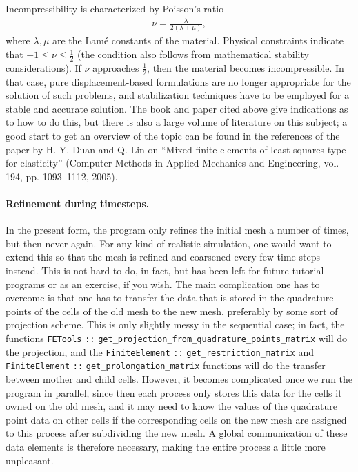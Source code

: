 \documentclass{article}
\begin{document}
Incompressibility is characterized by Poisson's ratio
\begin{gather*}
  \nu = \frac{\lambda}{2(\lambda+\mu)},
\end{gather*}
where $\lambda,\mu$ are the Lam\'e constants of the material.
Physical constraints indicate that $-1\le \nu\le \tfrac 12$ (the condition
also follows from mathematical stability considerations). If $\nu$
approaches $\tfrac 12$, then the material becomes incompressible. In that
case, pure displacement-based formulations are no longer appropriate for the
solution of such problems, and stabilization techniques have to be employed
for a stable and accurate solution. The book and paper cited above give
indications as to how to do this, but there is also a large volume of
literature on this subject; a good start to get an overview of the topic can
be found in the references of the paper by
H.-Y. Duan and Q. Lin on ``Mixed finite elements of least-squares type for
elasticity'' (Computer Methods in Applied Mechanics and Engineering, vol. 194,
pp. 1093--1112, 2005).


\paragraph*{Refinement during timesteps.} In the present form, the program
only refines the initial mesh a number of times, but then never again. For any
kind of realistic simulation, one would want to extend this so that the mesh
is refined and coarsened every few time steps instead. This is not hard to do,
in fact, but has been left for future tutorial programs or as an exercise, if
you wish. The main complication one has to overcome is that one has to
transfer the data that is stored in the quadrature points of the cells of the
old mesh to the new mesh, preferably by some sort of projection scheme. This
is only slightly messy in the sequential case; in fact, the functions
\texttt{FETools} \texttt{::} \texttt{get\_projection\_from\_quadrature\_points\_matrix} will do
the projection, and the \texttt{FiniteElement} \texttt{::} \texttt{get\_restriction\_matrix} and
\texttt{FiniteElement} \texttt{::} \texttt{get\_prolongation\_matrix} functions will do the
transfer between mother and child cells. However, it becomes complicated
once we run the program in parallel, since then each process only stores this
data for the cells it owned on the old mesh, and it may need to know the
values of the quadrature point data on other cells if the corresponding cells
on the new mesh are assigned to this process after subdividing the new mesh. A
global communication of these data elements is therefore necessary, making the
entire process a little more unpleasant.
\end{document}
